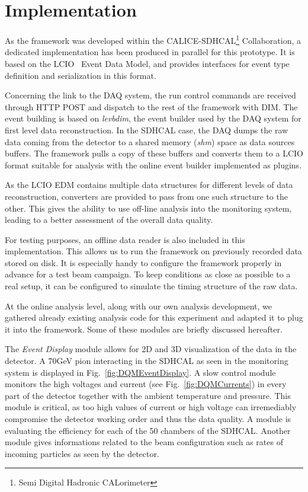 \documentclass[journal]{IEEEtran}
\begin{document}
\section{Implementation}

As the framework was developed within the CALICE-SDHCAL\footnote{Semi Digital Hadronic CALorimeter} Collaboration, a dedicated implementation has been produced in parallel for this prototype. It is based on the LCIO~\cite{LCIO} Event Data Model, and provides interfaces for event type definition and serialization in this format.


Concerning the link to the DAQ system, the run control commands are received through HTTP POST and dispatch to the rest of the framework with DIM. The event building is based on \textit{levbdim}, the event builder used by the DAQ system for first level data reconstruction. In the SDHCAL case, the DAQ dumps the raw data coming from the detector to a shared memory (\textit{shm}) space as data sources buffers. The framework pulls a copy of these buffers and converts them to a LCIO format suitable for analysis with the online event builder implemented as plugins.

As the LCIO EDM contains multiple data structures for different levels of data reconstruction, converters are provided to pass from one such structure to the other. This gives the ability to use off-line analysis into the monitoring system, leading to a better assessment of the overall data quality.

For testing purposes, an offline data reader is also included in this implementation. This allows us to run the framework on previously recorded data stored on disk. It is especially handy to configure the framework properly in advance for a test beam campaign. To keep conditions as close as possible to a real setup, it can be configured to simulate the timing structure of the raw data.

At the online analysis level, along with our own analysis development, we gathered already existing analysis code for this experiment and adapted it to plug it into the framework. Some of these modules are briefly discussed hereafter.

The \textit{Event Display} module allows for 2D and 3D visualization of the data in the detector. A 70GeV pion interacting in the SDHCAL as seen in the monitoring system is displayed in Fig.~\ref{fig:DQMEventDisplay}. A slow control module monitors the high voltages and current (see Fig.~\ref{fig:DQMCurrents}) in every part of the detector together with the ambient temperature and pressure. This module is critical, as too high values of current or high voltage can irremediably compromise the detector working order and thus the data quality. A module is evaluating the efficiency for each of the 50 chambers of the SDHCAL. Another module gives informations related to the beam configuration such as rates of incoming particles as seen by the detector.
\end{document}
